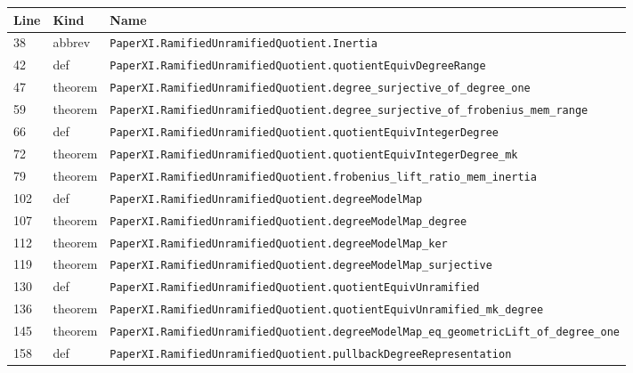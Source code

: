 \documentclass[10pt,oneside]{book}
\begin{document}
\begin{longtable}{@{}p{}p{}p{}@{}}\toprule Line&Kind&Name\\\midrule\endhead

38&abbrev&\nolinkurl{PaperXI.RamifiedUnramifiedQuotient.Inertia}\\

42&def&\nolinkurl{PaperXI.RamifiedUnramifiedQuotient.quotientEquivDegreeRange}\\

47&theorem&\nolinkurl{PaperXI.RamifiedUnramifiedQuotient.degree_surjective_of_degree_one}\\

59&theorem&\nolinkurl{PaperXI.RamifiedUnramifiedQuotient.degree_surjective_of_frobenius_mem_range}\\

66&def&\nolinkurl{PaperXI.RamifiedUnramifiedQuotient.quotientEquivIntegerDegree}\\

72&theorem&\nolinkurl{PaperXI.RamifiedUnramifiedQuotient.quotientEquivIntegerDegree_mk}\\

79&theorem&\nolinkurl{PaperXI.RamifiedUnramifiedQuotient.frobenius_lift_ratio_mem_inertia}\\

102&def&\nolinkurl{PaperXI.RamifiedUnramifiedQuotient.degreeModelMap}\\

107&theorem&\nolinkurl{PaperXI.RamifiedUnramifiedQuotient.degreeModelMap_degree}\\

112&theorem&\nolinkurl{PaperXI.RamifiedUnramifiedQuotient.degreeModelMap_ker}\\

119&theorem&\nolinkurl{PaperXI.RamifiedUnramifiedQuotient.degreeModelMap_surjective}\\

130&def&\nolinkurl{PaperXI.RamifiedUnramifiedQuotient.quotientEquivUnramified}\\

136&theorem&\nolinkurl{PaperXI.RamifiedUnramifiedQuotient.quotientEquivUnramified_mk_degree}\\

145&theorem&\nolinkurl{PaperXI.RamifiedUnramifiedQuotient.degreeModelMap_eq_geometricLift_of_degree_one}\\

158&def&\nolinkurl{PaperXI.RamifiedUnramifiedQuotient.pullbackDegreeRepresentation}\\


\end{longtable}
\end{document}
